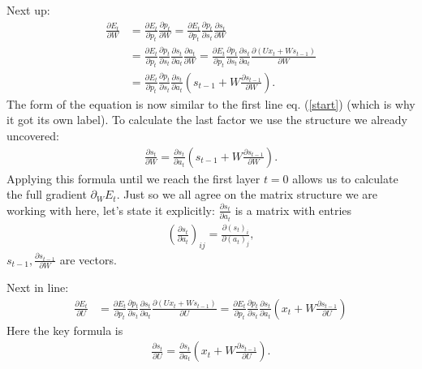 \documentclass[12pt]{article}
\numberwithin{equation}{section}
\newcommand{\rref}[1]{(\ref{#1})}
\begin{document}
Next up:
\begin{align}
\label{start}
\frac{\partial E_t}{\partial W} &= \frac{\partial E_t}{\partial p_t} \frac{\partial p_t}{\partial W} = \frac{\partial E_t}{\partial p_t} \frac{\partial p_t}{\partial s_t} \frac{\partial s_t}{\partial W} \\
&= \frac{\partial E_t}{\partial p_t} \frac{\partial p_t}{\partial s_t} \frac{\partial s_t}{\partial a_t} \frac{\partial a_t}{\partial W} = \frac{\partial E_t}{\partial p_t} \frac{\partial p_t}{\partial s_t} \frac{\partial s_t}{\partial a_t} \frac{\partial(Ux_t+ Ws_{t-1})}{\partial W} \nonumber \\
&= \frac{\partial E_t}{\partial p_t} \frac{\partial p_t}{\partial s_t} \frac{\partial s_t}{\partial a_t} \left(s_{t-1} + W \frac{\partial s_{t-1}}{\partial W} \right). 
\end{align}
The form of the equation is now similar to the first line eq. \rref{start} (which is why it got its own label). To calculate the last factor we use the structure we already uncovered:
\begin{align}
\frac{\partial s_t}{\partial W} =  \frac{\partial s_t}{\partial a_t} \left(s_{t-1} + W \frac{\partial s_{t-1}}{\partial W} \right).
\end{align}
Applying this formula until we reach the first layer \(t=0\) allows us to calculate the full gradient \(\partial_W E_t\). Just so we all agree on the matrix structure we are working with here, let's state it explicitly: \(\frac{\partial s_t}{\partial a_t}\) is a matrix with entries
\begin{align}
\left( \frac{\partial s_t}{\partial a_t}\right)_{ij} = \frac{\partial (s_t)_i}{\partial (a_t)_j},
\end{align}
\(s_{t-1}, \frac{\partial s_{t-1}}{\partial W}\) are vectors.

Next in line:
\begin{align}
\frac{\partial E_t}{\partial U} &= \frac{\partial E_t}{\partial p_t} \frac{\partial p_t}{\partial s_t} \frac{\partial s_t}{\partial a_t} \frac{ \partial (Ux_t + Ws_{t-1})}{\partial U} = \frac{\partial E_t}{\partial p_t} \frac{\partial p_t}{\partial s_t} \frac{\partial s_t}{\partial a_t} \left( x_t + W \frac{\partial s_{t-1}}{\partial U}\right) 
\end{align}
Here the key formula is
\begin{align}
\frac{\partial s_{t}}{\partial U} = \frac{\partial s_t}{\partial a_t}\left(x_t + W \frac{\partial s_{t-1}}{\partial U}\right).
\end{align}
\end{document}
